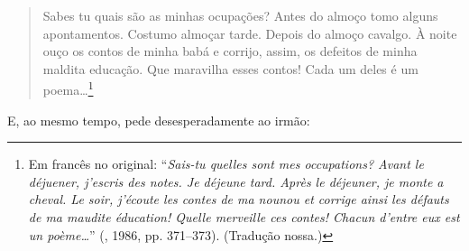 \begin{quotation}
Sabes tu quais são as minhas ocupações? Antes do almoço tomo alguns apontamentos. Costumo almoçar tarde. Depois do almoço cavalgo. À noite ouço os contos de minha babá e corrijo, assim, os defeitos de minha maldita educação. Que maravilha esses contos! Cada um deles é um poema\ldots{}\footnote{Em francês no original: ``\emph{Sais-tu quelles sont mes occupations? Avant le déjuener, j'escris des notes. Je déjeune tard. Après le déjeuner, je monte a cheval. Le soir, j'écoute les contes de ma nounou et corrige ainsi les défauts de ma maudite éducation! Quelle merveille ces contes! Chacun d'entre eux est un poème\ldots{}}'' (, 1986, pp. 371--373). (Tradução nossa.)}
\end{quotation}


E, ao mesmo tempo, pede desesperadamente ao irmão:

